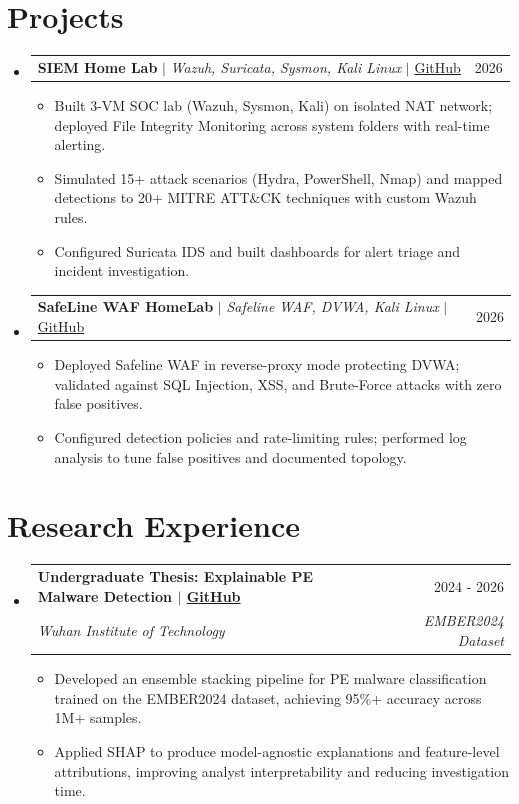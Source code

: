 \documentclass[letterpaper,11pt]{article}
\makeatletter
\newcommand{\resumeItem}[1]{
  \item\small{#1}
}
\newcommand{\resumeSubheading}[4]{
  \vspace{-2pt}\item
    \begin{tabular*}{0.97\textwidth}[t]{l@{\extracolsep{\fill}}r}
      \textbf{#1} & #2 \\
      \textit{\small#3} & \textit{\small #4} \\
    \end{tabular*}\vspace{-7pt}
}
\newcommand{\resumeProjectHeading}[2]{
    \item
    \begin{tabular*}{0.97\textwidth}{l@{\extracolsep{\fill}}r}
      \small#1 & #2 \\
    \end{tabular*}\vspace{-7pt}
}
\newcommand{\resumeSubHeadingListStart}{\begin{itemize}[leftmargin=0.15in, label={}]}
\newcommand{\resumeSubHeadingListEnd}{\end{itemize}}
\newcommand{\resumeItemListStart}{\begin{itemize}}
\newcommand{\resumeItemListEnd}{\end{itemize}\vspace{-5pt}}
\makeatother
\begin{document}
\section{Projects}
    \resumeSubHeadingListStart%
\resumeProjectHeading%
          {\textbf{SIEM Home Lab} $|$ \emph{Wazuh, Suricata, Sysmon, Kali Linux} $|$ \href{https://github.com/Sohanuzzaman3301/SIEM_Home_Lab}{\small GitHub}}{2026}
          \resumeItemListStart%
            \resumeItem{Built 3-VM SOC lab (Wazuh, Sysmon, Kali) on isolated NAT network; deployed File Integrity Monitoring across system folders with real-time alerting.}
            \resumeItem{Simulated 15+ attack scenarios (Hydra, PowerShell, Nmap) and mapped detections to 20+ MITRE ATT\&CK techniques with custom Wazuh rules.}
            \resumeItem{Configured Suricata IDS and built dashboards for alert triage and incident investigation.}
          \resumeItemListEnd%

\resumeProjectHeading%
          {\textbf{SafeLine WAF HomeLab} $|$ \emph{Safeline WAF, DVWA, Kali Linux} $|$ \href{https://github.com/Sohanuzzaman3301/safeline-waf-homelab}{\small GitHub}}{2026}
          \resumeItemListStart%
\resumeItem{Deployed Safeline WAF in reverse-proxy mode protecting DVWA; validated against SQL Injection, XSS, and Brute-Force attacks with zero false positives.}
            \resumeItem{Configured detection policies and rate-limiting rules; performed log analysis to tune false positives and documented topology.}
      \resumeItemListEnd%
    \resumeSubHeadingListEnd%


\section{Research Experience}
    \resumeSubHeadingListStart%
      \resumeSubheading%
          {\textbf{Undergraduate Thesis: Explainable PE Malware Detection} $|$ \href{https://github.com/Sohanuzzaman3301/pe-malware-ensemble/}{\small GitHub}}{2024 - 2026}
          {Wuhan Institute of Technology}{EMBER2024 Dataset}
          \resumeItemListStart%
            \resumeItem{Developed an ensemble stacking pipeline for PE malware classification trained on the EMBER2024 dataset, achieving 95\%+ accuracy across 1M+ samples.}
            \resumeItem{Applied SHAP to produce model-agnostic explanations and feature-level attributions, improving analyst interpretability and reducing investigation time.}
          \resumeItemListEnd%
    \resumeSubHeadingListEnd%
\end{document}
